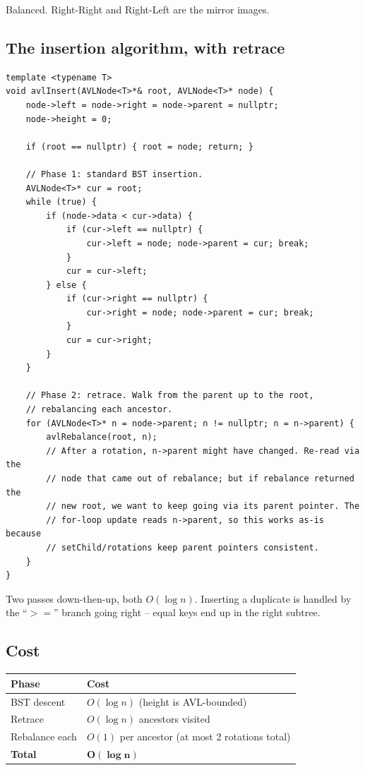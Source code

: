 \documentclass[11pt]{article}
\begin{document}
Balanced. Right-Right and Right-Left are the mirror images.

\subsection*{The insertion algorithm, with retrace}

\begin{lstlisting}
template <typename T>
void avlInsert(AVLNode<T>*& root, AVLNode<T>* node) {
    node->left = node->right = node->parent = nullptr;
    node->height = 0;

    if (root == nullptr) { root = node; return; }

    // Phase 1: standard BST insertion.
    AVLNode<T>* cur = root;
    while (true) {
        if (node->data < cur->data) {
            if (cur->left == nullptr) {
                cur->left = node; node->parent = cur; break;
            }
            cur = cur->left;
        } else {
            if (cur->right == nullptr) {
                cur->right = node; node->parent = cur; break;
            }
            cur = cur->right;
        }
    }

    // Phase 2: retrace. Walk from the parent up to the root,
    // rebalancing each ancestor.
    for (AVLNode<T>* n = node->parent; n != nullptr; n = n->parent) {
        avlRebalance(root, n);
        // After a rotation, n->parent might have changed. Re-read via the
        // node that came out of rebalance; but if rebalance returned the
        // new root, we want to keep going via its parent pointer. The
        // for-loop update reads n->parent, so this works as-is because
        // setChild/rotations keep parent pointers consistent.
    }
}
\end{lstlisting}

Two passes down-then-up, both $O(\log n)$. Inserting a duplicate is handled by the ``$>=$'' branch going right -- equal keys end up in the right subtree.

\subsection*{Cost}

\begin{center}
\begin{tabular}{ll}
Phase          & Cost \\
\hline
BST descent    & $O(\log n)$ (height is AVL-bounded) \\
Retrace        & $O(\log n)$ ancestors visited \\
Rebalance each & $O(1)$ per ancestor (at most 2 rotations total) \\
\hline
\textbf{Total} & $\mathbf{O(\log n)}$ \\
\end{tabular}
\end{center}
\end{document}
